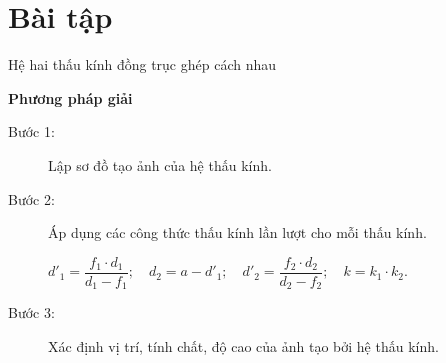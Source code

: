 \section{Bài tập }
\begin{dang}{Hệ hai thấu kính đồng trục ghép cách nhau}
\end{dang}
\textbf{Phương pháp giải}
\begin{description}
	\item[Bước 1:] Lập sơ đồ tạo ảnh của hệ thấu kính.
	\item[Bước 2:] Áp dụng các công thức thấu kính lần lượt cho mỗi thấu kính.

	$ d'_1=\dfrac{f_1\cdot d_1}{d_1-f_1};\quad d_2=a-d'_1;\quad d'_2=\dfrac{f_2\cdot d_2}{d_2-f_2};\quad k=k_1\cdot k_2$.
	\item[Bước 3:] Xác định vị trí, tính chất, độ cao của ảnh tạo bởi hệ thấu kính.
\end{description}
\vspace{1em}
